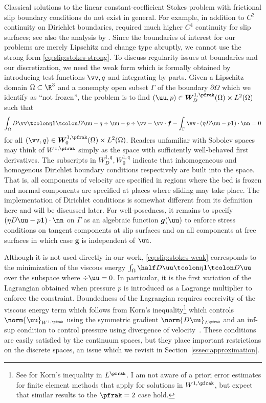 Classical solutions to the linear constant-coefficient Stokes problem with frictional slip boundary conditions do not exist in general.
For example, in addition to $C^2$ continuity on Dirichlet boundaries, \citet{saito2004stokes} required much higher $C^4$ continuity for slip surfaces; see also the analysis by \citet{fujita2002coherent}.
Since the boundaries of interest for our problems are merely Lipschitz and change type abruptly, we cannot use the strong form \eqref{eq:slip:stokes-strong}.
To discuss regularity issues at boundaries and our discretization, we need the weak form which is formally obtained by introducing test functions $\vv,q$ and integrating by parts.
Given a Lipschitz domain $\Omega \subset \R^3$ and a nonempty open subset $\Gamma$ of the boundary $\partial\Omega$ which we identify as ``not frozen'', the problem is to find $(\uu,p) \in \bm W_D^{1,\pfrak}(\Omega) \times L^2(\Omega)$ such that
\begin{equation}\label{eq:slip:stokes-weak}
  \int_\Omega D\vv\tcolon \eta\bm 1 \tcolon D\uu - q\div\uu - p\div\vv - \vv\cdot\bm f
  - \int_\Gamma \vv\cdot (\eta D\uu - p\bm 1)\cdot\nn = 0
\end{equation}
for all $(\vv,q)\in \bm W_0^{1,\pfrak}(\Omega) \times L^2(\Omega)$.
Readers unfamiliar with Sobolev spaces may think of $W^{1,\pfrak}$ simply as the space with sufficiently well-behaved first derivatives.
The subscripts in $W_D^{1,\mathfrak{q}},W_0^{1,\mathfrak{q}}$ indicate that inhomogeneous and homogenous Dirichlet boundary conditions respectively are built into the space.
That is, all components of velocity are specified in regions where the bed is frozen and normal components are specified at places where sliding may take place.
The implementation of Dirichlet conditions is somewhat different from its definition here and will be discussed later.
For well-posedness, it remains to specify $(\eta D\uu - p\bm 1)\cdot\nn$ on $\Gamma$ as an algebraic function $\bm g(\uu)$ to enforce stress conditions on tangent components at slip surfaces and on all components at free surfaces in which case $\bm g$ is independent of $\uu$.

Although it is not used directly in our work, \eqref{eq:slip:stokes-weak} corresponds to the minimization of the viscous energy $\int_\Omega \half D\uu\tcolon \eta\bm 1 \tcolon D\uu$ over the subspace where $\div\uu = 0$.
In particular, it is the first variation of the Lagrangian obtained when pressure $p$ is introduced as a Lagrange multiplier to enforce the constraint.
Boundedness of the Lagrangian requires coercivity of the viscous energy term which follows from Korn's inequality\footnote{%
See \citet{kondratev1988boundary} for Korn's inequality in $L^\pfrak$.
I am not aware of a priori error estimates for finite element methods that apply for solutions in $W^{1,\pfrak}$, but expect that similar results to the $\pfrak=2$ case hold.}
which controls $\norm{\uu}_{W^{1,\pfrak}}$ using the symmetric gradient $\norm{D\uu}_{L^\pfrak}$ and an inf-sup condition to control pressure using divergence of velocity~\citep{evans1998partial,brenner2008mathematical}.
These conditions are easily satisfied by the continuum spaces, but they place important restrictions on the discrete spaces, an issue which we revisit in Section~\ref{sssec:approximation}.


